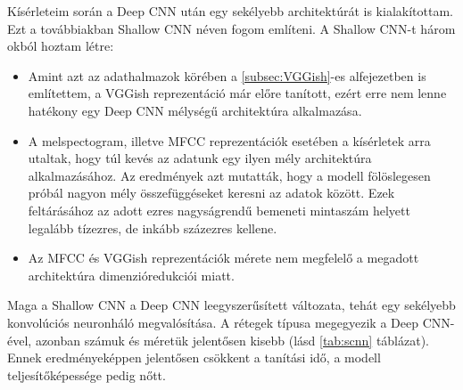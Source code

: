 Kísérleteim során a Deep CNN után egy sekélyebb architektúrát is kialakítottam. Ezt a továbbiakban Shallow CNN néven fogom említeni. A Shallow CNN-t három okból hoztam létre:
 
\begin{itemize}
 \item Amint azt az adathalmazok körében a \ref{subsec:VGGish}-es alfejezetben is említettem, a VGGish reprezentáció már előre tanított, ezért erre nem lenne hatékony egy Deep CNN mélységű architektúra alkalmazása.
 \item A melspectogram, illetve MFCC reprezentációk esetében a kísérletek arra utaltak, hogy túl kevés az adatunk egy ilyen mély architektúra alkalmazásához. Az eredmények azt mutatták, hogy a modell fölöslegesen próbál nagyon mély összefüggéseket keresni az adatok között. Ezek feltárásához az adott ezres nagyságrendű bemeneti mintaszám helyett legalább tízezres, de inkább százezres kellene.
 \item Az MFCC és VGGish reprezentációk mérete nem megfelelő a megadott architektúra dimenzióredukciói miatt.
\end{itemize}

Maga a Shallow CNN a Deep CNN leegyszerűsített változata, tehát egy sekélyebb konvolúciós neuronháló megvalósítása. A rétegek típusa megegyezik a Deep CNN-ével, azonban számuk és méretük jelentősen kisebb (lásd \ref{tab:scnn} táblázat). Ennek eredményeképpen jelentősen csökkent a tanítási idő, a modell teljesítőképessége pedig nőtt.


